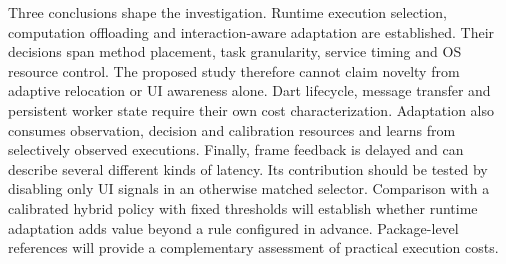\documentclass[14pt,a4paper,oneside]{extreport}
\begin{document}
Three conclusions shape the investigation. Runtime execution selection, computation
offloading and interaction-aware adaptation are established. Their decisions span method
placement, task granularity, service timing and OS resource control. The proposed study
therefore cannot claim novelty from adaptive relocation or UI awareness alone. Dart lifecycle,
message transfer and persistent worker state require their own cost characterization.
Adaptation also consumes observation, decision and calibration resources and
learns from selectively observed executions. Finally, frame feedback is delayed and can
describe several different kinds of latency. Its contribution should be tested by disabling
only UI signals in an otherwise matched selector. Comparison with a calibrated hybrid policy
with fixed thresholds will establish whether runtime adaptation adds value beyond a rule
configured in advance. Package-level references will provide a complementary assessment of
practical execution costs.
\end{document}
